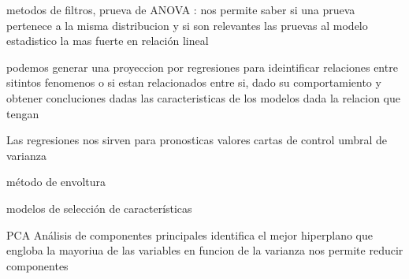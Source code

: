 metodos de filtros,
        prueva de ANOVA : nos permite saber si una prueva pertenece a la
         misma distribucion y si son relevantes las pruevas al modelo estadistico 
         la mas fuerte en relación lineal

    podemos generar una proyeccion por regresiones para ideintificar
     relaciones entre sitintos fenomenos o si estan relacionados entre 
     si, dado su comportamiento y obtener concluciones dadas las 
     caracteristicas de los modelos dada la relacion que tengan

    Las regresiones nos sirven para pronosticas valores
        cartas de control
        umbral de varianza

método de envoltura

modelos de selección de características

PCA Análisis de componentes principales identifica el mejor hiperplano que engloba la mayoriua de las variables en funcion de la varianza
nos permite reducir componentes 
